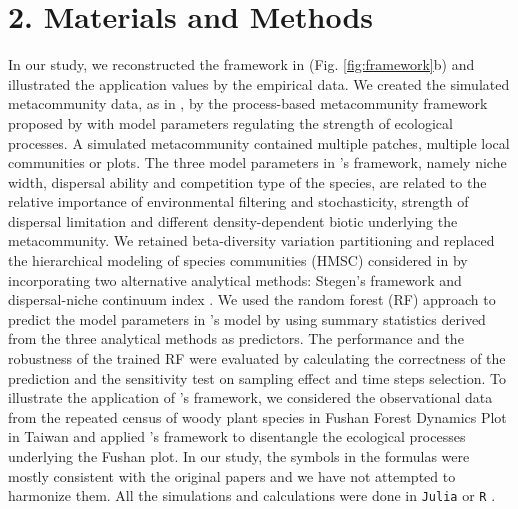 \chapter*{2. Materials and Methods}
\setcounter{chapter}{2}
\noindent
In our study, we reconstructed the framework in \citet{guzman2022accounting} (Fig. \ref{fig:framework}b) and illustrated the application values by the empirical data. We created the simulated metacommunity data, as in \citet{guzman2022accounting}, by the process-based metacommunity framework proposed by \citet{thompson2020process} with model parameters regulating the strength of \DIFaddbegin {}\DIFaddend ecological processes. A simulated metacommunity contained multiple patches, \DIFdelbegin {}\DIFdelend \DIFaddbegin {}\DIFaddend multiple local communities or plots. The three model parameters in \citeauthor{thompson2020process}'s framework, namely niche width, dispersal ability and competition type of the species, are related to the relative importance of environmental filtering and stochasticity, strength of dispersal limitation and different density-dependent biotic \DIFdelbegin {}\DIFdelend \DIFaddbegin {}\DIFaddend underlying the metacommunity. We retained beta-diversity variation partitioning and replaced the hierarchical modeling of species communities (HMSC) considered in \citet{guzman2022accounting} by incorporating two alternative analytical methods: Stegen's framework \citep{stegen2013quantifying} and \DIFaddbegin {}\DIFaddend dispersal-niche continuum index \citep{vilmi2021dispersal}. We used the random forest (RF) approach to predict the model parameters in \citeauthor{thompson2020process}'s model by using \DIFaddbegin {}\DIFaddend summary statistics derived from the three analytical methods as predictors. The performance and the robustness of the trained RF were evaluated by calculating the correctness of the prediction and the sensitivity test on sampling effect and time steps selection. To illustrate the application of \citeauthor{guzman2022accounting}'s framework, we considered the observational data from the repeated census of woody plant species in Fushan Forest Dynamics Plot in Taiwan and applied \citeauthor{guzman2022accounting}'s framework to disentangle the ecological processes underlying the Fushan plot. In our study, the symbols in the formulas were mostly consistent with the original papers and we have not attempted to harmonize them. All the simulations and calculations were done in \texttt{Julia} \citep{bezanson2017julia} or \texttt{R} \citep{R}.


